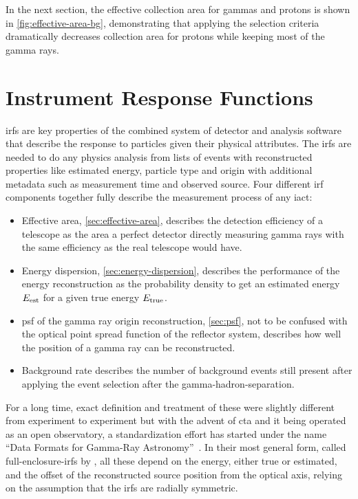 In the next section, the effective collection area for gammas and protons is shown 
in \autoref{fig:effective-area-bg}, demonstrating that applying the 
selection criteria dramatically decreases collection area for protons while keeping
most of the gamma rays.


\section{Instrument Response Functions}\label{sec:irf}

\Glspl{irf} are key properties of the combined system
of detector and analysis software that describe the response to particles given
their physical attributes.
The \glspl{irf} are needed to do any physics analysis from lists
of events with reconstructed properties like estimated energy, particle type and origin
with additional metadata such  as measurement time and observed source.
Four different \gls{irf} components together fully describe the measurement process of any \gls{iact}:
\begin{itemize}
  \item Effective area, \autoref{sec:effective-area}, describes the detection
    efficiency of a telescope as the area a perfect detector directly measuring 
    gamma rays with the same efficiency as the real telescope would have.  
  \item Energy dispersion, \autoref{sec:energy-dispersion}, describes
    the performance of the energy reconstruction as the probability density 
    to get an estimated energy $\Eest$ for a given true energy $\Etrue$.
  \item \Gls{psf} of the gamma ray origin reconstruction, \autoref{sec:psf},
    not to be confused with the optical point spread function of the reflector system,
    describes how well the position of a gamma ray can be reconstructed.
  \item Background rate describes the number of background events still present after
    applying the event selection after the gamma-hadron-separation.
\end{itemize}

For a long time, exact definition and treatment of these were slightly different 
from experiment to experiment but with the advent of \gls{cta} and it being
operated as an open observatory, a standardization effort has started
 under the name \enquote{Data Formats for Gamma-Ray Astronomy}~\cite{ogadf}.
In their most general form, called full-enclosure-\glspl{irf} by \cite{ogadf},
all these depend on the energy, either true or estimated, and the offset of the reconstructed
source position from the optical axis, 
relying on the assumption that the \glspl{irf} are radially symmetric.

